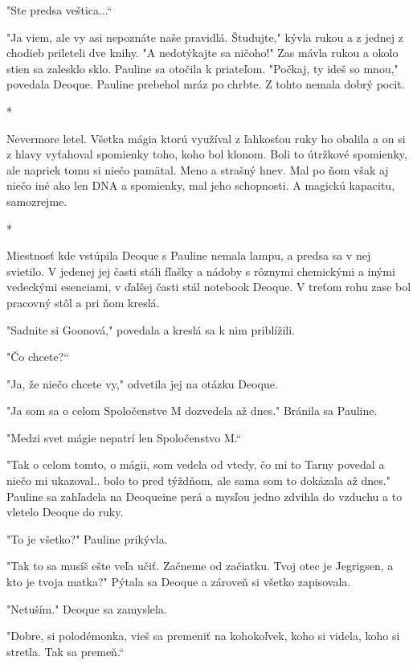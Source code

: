 \documentclass{book}
\begin{document}
"Ste predsa veštica...“

"Ja viem, ale vy asi nepoznáte naše pravidlá. Študujte,"$ $ kývla rukou a z jednej z chodieb prileteli dve knihy. "$ $A nedotýkajte sa ničoho!"$ $ Zas mávla rukou a okolo stien sa zalesklo sklo. Pauline sa otočila k priateľom. "Počkaj, ty ideš so mnou,"$ $ povedala Deoque. Pauline prebehol mráz po chrbte. Z tohto nemala dobrý pocit.

\begin{center}
*
\end{center}

Nevermore letel. Všetka mágia ktorú využíval z ľahkosťou ruky ho obalila a on si z hlavy vyťahoval spomienky toho, koho bol klonom. Boli to útržkové spomienky, ale napriek tomu si niečo pamätal. Meno a strašný hnev. Mal po ňom však aj niečo iné ako len DNA a spomienky, mal jeho schopnosti. A magickú kapacitu, samozrejme.

\begin{center}
*
\end{center}

Miestnosť kde vstúpila Deoque s Pauline nemala lampu, a predsa sa v nej svietilo. V jedenej jej časti stáli fľašky a nádoby s rôznymi chemickými a inými vedeckými esenciami, v ďalšej časti stál notebook Deoque. V treťom rohu zase bol pracovný stôl a pri ňom kreslá.

"Sadnite si Goonová,"$ $ povedala a kreslá sa k nim priblížili.

"Čo chcete?“

"Ja, že niečo chcete vy,"$ $ odvetila jej na otázku Deoque.

"Ja som sa o celom Spoločenstve M dozvedela až dnes."$ $ Bránila sa Pauline.

"Medzi svet mágie nepatrí len Spoločenstvo M.“

"Tak o celom tomto, o mágii, som vedela od vtedy, čo mi to Tarny povedal a niečo mi ukazoval.. bolo to pred týždňom, ale sama som to dokázala až dnes."$ $ Pauline sa zahľadela na Deoqueine perá a mysľou jedno zdvihla do vzduchu a to vletelo Deoque do ruky.

"To je všetko?"$ $ Pauline prikývla.

"Tak to sa musíš ešte veľa učiť. Začneme od začiatku. Tvoj otec je Jegrigsen, a kto je tvoja matka?"$ $ Pýtala sa Deoque a zároveň si všetko zapisovala.

"Netuším."$ $ Deoque sa zamyslela.

"Dobre, si polodémonka, vieš sa premeniť na kohokoľvek, koho si videla, koho si stretla. Tak sa premeň.“
\end{document}
